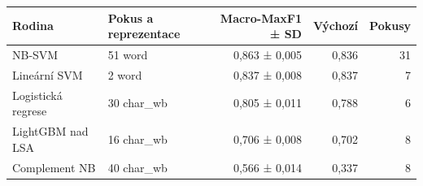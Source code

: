 \begin{tabular}{llrrr}
\toprule
Rodina & Pokus a reprezentace & Macro-MaxF1 ± SD & Výchozí & Pokusy\\
\midrule
NB-SVM & 51 word & 0,863 ± 0,005 & 0,836 & 31\\
Lineární SVM & 2 word & 0,837 ± 0,008 & 0,837 & 7\\
Logistická regrese & 30 char\_wb & 0,805 ± 0,011 & 0,788 & 6\\
LightGBM nad LSA & 16 char\_wb & 0,706 ± 0,008 & 0,702 & 8\\
Complement NB & 40 char\_wb & 0,566 ± 0,014 & 0,337 & 8\\
\bottomrule
\end{tabular}
